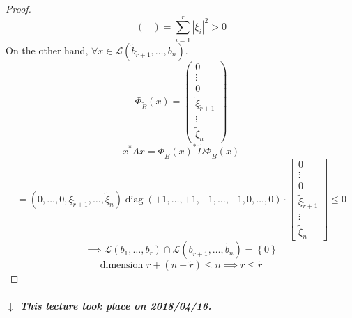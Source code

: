\documentclass[a4paper]{article}
\numberwithin{lecref}{section}
\newcommand{\set}[1]{\left\{#1\right\}}
\newcommand{\card}[1]{\left|#1\right|}
\newcommand{\dateref}[1]{%
  \begin{mdframed}[backgroundcolor=gray!10,innerbottommargin=0pt,innertopmargin=0pt]
    \paragraph{\textit{$\downarrow$ This lecture took place on #1.}}%
  \end{mdframed}%
}
\begin{document}
\begin{proof}
\[\begin{pmatrix}
    \end{pmatrix}
    = \sum_{i=1}^r \card{\xi_i}^2 > 0
  \]
  On the other hand, $\forall x \in \mathcal L(\tilde b_{\tilde r + 1}, \dots, \tilde b_n)$.
  \[
    \Phi_{\tilde B}(x) =
      \begin{pmatrix}
        0 \\ \vdots \\ 0 \\
        \tilde \xi_{\tilde r+1} \\
        \vdots \\ \tilde \xi_n
      \end{pmatrix}
  \] \[
    x^* Ax = \Phi_{\tilde B}(x)^* \tilde D \Phi_{\tilde B}(x)
  \] \[
    = (0, \dots, 0, \tilde \xi_{\tilde r + 1}, \dots, \tilde \xi_n)
    \operatorname{diag}(+1, \dots, +1, -1, \dots, -1, 0, \dots, 0)
    \cdot \begin{bmatrix}
      0 \\ \vdots \\ 0 \\ \tilde \xi_{\tilde r+1} \\ \vdots \\ \tilde \xi_n
    \end{bmatrix} \leq 0
  \] \[
    \implies \mathcal L(b_1, \dots, b_r) \cap \mathcal L(\tilde b_{\tilde r+1}, \dots, \tilde b_n) = \set{0}
  \] \[
    \text{dimension } r + (n - \tilde r) \leq n \implies r \leq \tilde r
  \]
\end{proof}

\dateref{2018/04/16}
\end{document}
